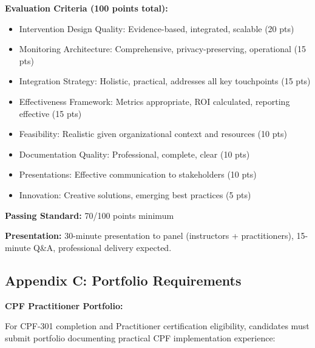 \documentclass[11pt,a4paper]{article}
\begin{document}
\textbf{Evaluation Criteria (100 points total):}
\begin{itemize}
\item Intervention Design Quality: Evidence-based, integrated, scalable (20 pts)
\item Monitoring Architecture: Comprehensive, privacy-preserving, operational (15 pts)
\item Integration Strategy: Holistic, practical, addresses all key touchpoints (15 pts)
\item Effectiveness Framework: Metrics appropriate, ROI calculated, reporting effective (15 pts)
\item Feasibility: Realistic given organizational context and resources (10 pts)
\item Documentation Quality: Professional, complete, clear (10 pts)
\item Presentations: Effective communication to stakeholders (10 pts)
\item Innovation: Creative solutions, emerging best practices (5 pts)
\end{itemize}

\textbf{Passing Standard:} 70/100 points minimum

\textbf{Presentation:} 30-minute presentation to panel (instructors + practitioners), 15-minute Q\&A, professional delivery expected.

\subsection{Appendix C: Portfolio Requirements}

\textbf{CPF Practitioner Portfolio:}

For CPF-301 completion and Practitioner certification eligibility, candidates must submit portfolio documenting practical CPF implementation experience:
\end{document}

